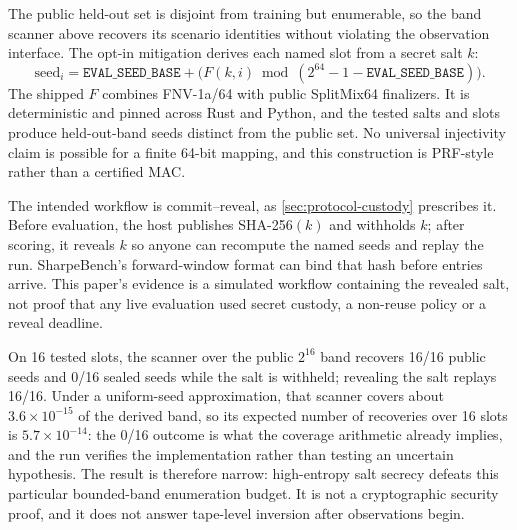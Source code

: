 The public held-out set is disjoint from training but enumerable, so the band scanner above recovers its scenario identities without violating the observation interface. The opt-in mitigation derives each named slot from a secret salt $k$:
\[
\mathrm{seed}_i=\texttt{EVAL\_SEED\_BASE}+
\bigl(F(k,i)\bmod(2^{64}-1-\texttt{EVAL\_SEED\_BASE})\bigr).
\]
The shipped $F$ combines FNV-1a/64 with public SplitMix64 finalizers. It is deterministic and pinned across Rust and Python, and the tested salts and slots produce held-out-band seeds distinct from the public set. No universal injectivity claim is possible for a finite 64-bit mapping, and this construction is PRF-style rather than a certified MAC.

The intended workflow is commit--reveal, as \cref{sec:protocol-custody} prescribes it. Before evaluation, the host publishes SHA-256$(k)$ and withholds $k$; after scoring, it reveals $k$ so anyone can recompute the named seeds and replay the run. SharpeBench's forward-window format can bind that hash before entries arrive. This paper's evidence is a simulated workflow containing the revealed salt, not proof that any live evaluation used secret custody, a non-reuse policy or a reveal deadline.

On 16 tested slots, the scanner over the public $2^{16}$ band recovers 16/16 public seeds and 0/16 sealed seeds while the salt is withheld; revealing the salt replays 16/16. Under a uniform-seed approximation, that scanner covers about $3.6\times10^{-15}$ of the derived band, so its expected number of recoveries over 16 slots is $5.7\times10^{-14}$: the 0/16 outcome is what the coverage arithmetic already implies, and the run verifies the implementation rather than testing an uncertain hypothesis. The result is therefore narrow: high-entropy salt secrecy defeats this particular bounded-band enumeration budget. It is not a cryptographic security proof, and it does not answer tape-level inversion after observations begin.
